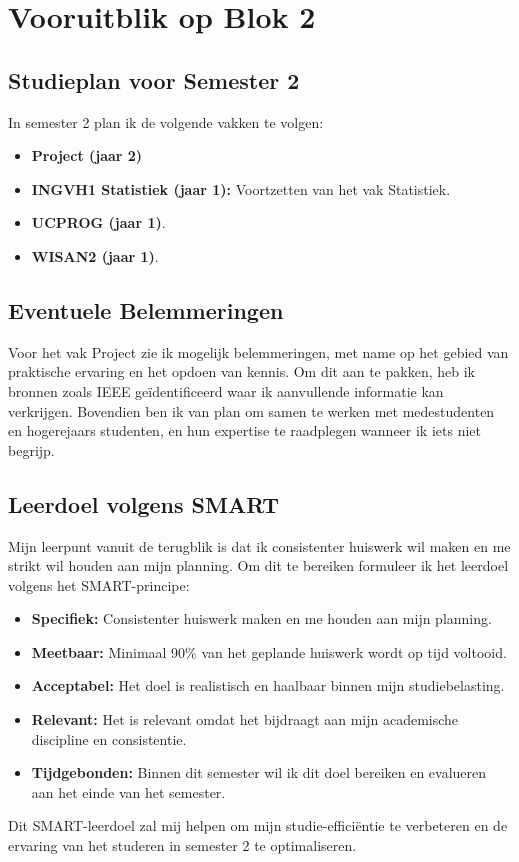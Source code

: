 \section{Vooruitblik op Blok 2}
\subsection{Studieplan voor Semester 2}

In semester 2 plan ik de volgende vakken te volgen:
\begin{itemize}
    \item \textbf{Project (jaar 2)}
    \item \textbf{INGVH1 Statistiek (jaar 1):} Voortzetten van het vak Statistiek.
    \item \textbf{UCPROG (jaar 1)}.
    \item \textbf{WISAN2 (jaar 1)}.
\end{itemize}

\subsection{Eventuele Belemmeringen}
Voor het vak Project zie ik mogelijk belemmeringen, met name op het gebied van praktische ervaring en het opdoen van kennis. Om dit aan te pakken, heb ik bronnen zoals IEEE geïdentificeerd waar ik aanvullende informatie kan verkrijgen. Bovendien ben ik van plan om samen te werken met medestudenten en hogerejaars studenten, en hun expertise te raadplegen wanneer ik iets niet begrijp.

\subsection{Leerdoel volgens SMART}
Mijn leerpunt vanuit de terugblik is dat ik consistenter huiswerk wil maken en me strikt wil houden aan mijn planning. Om dit te bereiken formuleer ik het leerdoel volgens het SMART-principe:

\begin{itemize}
    \item \textbf{Specifiek:} Consistenter huiswerk maken en me houden aan mijn planning.
    \item \textbf{Meetbaar:} Minimaal 90\% van het geplande huiswerk wordt op tijd voltooid.
    \item \textbf{Acceptabel:} Het doel is realistisch en haalbaar binnen mijn studiebelasting.
    \item \textbf{Relevant:} Het is relevant omdat het bijdraagt aan mijn academische discipline en consistentie.
    \item \textbf{Tijdgebonden:} Binnen dit semester wil ik dit doel bereiken en evalueren aan het einde van het semester.
\end{itemize}

Dit SMART-leerdoel zal mij helpen om mijn studie-efficiëntie te verbeteren en de ervaring van het studeren in semester 2 te optimaliseren.